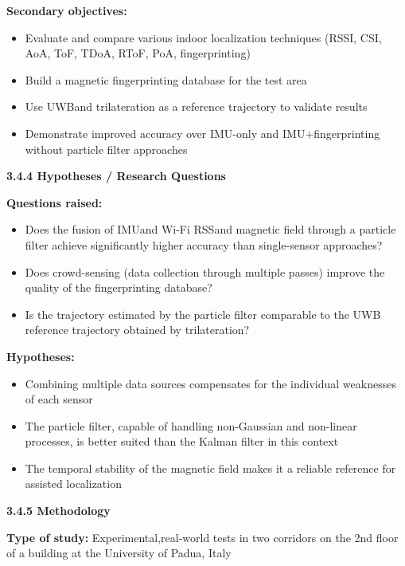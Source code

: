 \documentclass{ipgpmaster}
\begin{document}
\textbf{Secondary objectives:}

\begin{itemize}
    \item Evaluate and compare various indoor localization techniques (RSSI, CSI, AoA, ToF, TDoA, RToF, PoA, fingerprinting)
    \item Build a magnetic fingerprinting database for the test area
    \item Use UWBand  trilateration as a reference trajectory to validate results
    \item Demonstrate improved accuracy over IMU-only and IMU+fingerprinting without particle filter approaches




\end{itemize}
 \textbf{3.4.4   Hypotheses / Research Questions}

\textbf{Questions raised:}
\begin{itemize}
    \item Does the fusion of IMUand  Wi-Fi RSSand  magnetic field through a particle filter achieve significantly higher accuracy than single-sensor approaches?
    \item Does crowd-sensing (data collection through multiple passes) improve the quality of the fingerprinting database?
    \item Is the trajectory estimated by the particle filter comparable to the UWB reference trajectory obtained by trilateration?


\end{itemize}
\textbf{Hypotheses:}
\begin{itemize}
    \item Combining multiple data sources compensates for the individual weaknesses of each sensor
    \item The particle filter, capable of handling non-Gaussian and non-linear processes, is better suited than the Kalman filter in this context
    \item The temporal stability of the magnetic field makes it a reliable reference for assisted localization



\end{itemize}
 \textbf{3.4.5 Methodology}

\textbf{Type of study:} Experimental,real-world tests in two corridors on the 2nd floor of a building at the University of Padua, Italy
\end{document}
